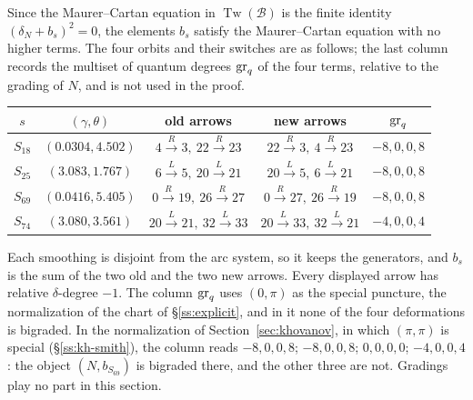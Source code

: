 Since the Maurer--Cartan equation in $\operatorname{Tw}(\mathcal B)$ is the finite identity
$(\delta_N+b_s)^2=0$, the elements $b_s$ satisfy the Maurer--Cartan equation with no higher terms.  The
four orbits and their
switches are as follows; the last column records the multiset of quantum degrees $\operatorname{gr}_q$ of the four terms, relative to the grading of $N$, and is not used in the proof.
\begin{center}
\small
\begin{tabular}{c|c|c|c|c}
$s$ & $(\gamma,\theta)$ & old arrows & new arrows & $\operatorname{gr}_q$ \\ \hline
$S_{18}$ & $(0.0304,4.502)$ & $4\xrightarrow R3,\ 22\xrightarrow R23$
 & $22\xrightarrow R3,\ 4\xrightarrow R23$ & $-8,0,0,8$ \\
$S_{25}$ & $(3.083,1.767)$ & $6\xrightarrow L5,\ 20\xrightarrow L21$
 & $20\xrightarrow L5,\ 6\xrightarrow L21$ & $-8,0,0,8$ \\
$S_{69}$ & $(0.0416,5.405)$ & $0\xrightarrow R19,\ 26\xrightarrow R27$
 & $0\xrightarrow R27,\ 26\xrightarrow R19$ & $-8,0,0,8$ \\
$S_{74}$ & $(3.080,3.561)$ & $20\xrightarrow L21,\ 32\xrightarrow L33$
 & $20\xrightarrow L33,\ 32\xrightarrow L21$ & $-4,0,0,4$
\end{tabular}
\end{center}
Each smoothing is disjoint from the arc system, so it keeps the generators, and $b_s$ is the sum of
the two old and the two new arrows.  Every displayed arrow has relative $\delta$-degree $-1$.  The column
$\operatorname{gr}_q$ uses $(0,\pi)$ as the special puncture, the normalization of the chart of \S\ref{ss:explicit}, and in
it none of the four deformations is bigraded.  In the normalization of Section~\ref{sec:khovanov}, in which
$(\pi,\pi)$ is special (\S\ref{ss:kh-smith}), the column reads $-8,0,0,8$; $-8,0,0,8$; $0,0,0,0$;
$-4,0,0,4$: the object $(N,b_{S_{69}})$ is bigraded there, and the other three are not.  Gradings play no
part in this section.

